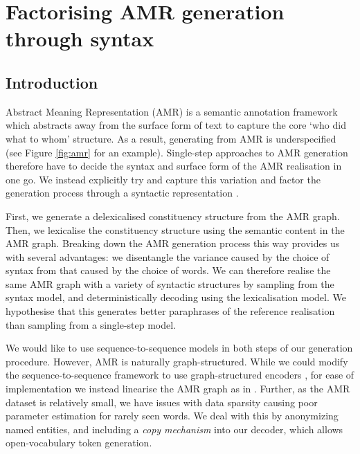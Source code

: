 \chapter{Factorising AMR generation through syntax}

\label{chap:amrgeneration}

\section{Introduction}

Abstract Meaning Representation (AMR) \citep{Baranescu:13} is a semantic annotation framework which abstracts away from the surface form of text to capture the core `who did what to whom' structure. As a result, generating from AMR is underspecified (see Figure \ref{fig:amr} for an example). Single-step approaches to AMR generation \citep{Flanigan:16,Konstas:17,Song:16,Song:17} therefore have to decide the syntax and surface form of the AMR realisation in one go. We instead explicitly try and capture this variation and factor the generation process through a syntactic representation \citep{Walker:03,Dusek:16,Gardent:17}. 

First, we generate a delexicalised constituency structure from the AMR graph. Then, we lexicalise the constituency structure using the semantic content in the AMR graph. Breaking down the AMR generation process this way provides us with several advantages: we disentangle the variance caused by the choice of syntax from that caused by the choice of words. We can therefore realise the same AMR graph with a variety of syntactic structures by sampling from the syntax model, and deterministically decoding using the lexicalisation model. We hypothesise that this generates better paraphrases of the reference realisation than sampling from a single-step model.

We would like to use sequence-to-sequence models \citep{Sutskever:14,Bahdanau:15} in both steps of our generation procedure. However, AMR is naturally graph-structured. While we could modify the sequence-to-sequence framework to use graph-structured encoders \citep{Kipf:16,Song:18,Beck:18,Marcheggiani:18}, for ease of implementation we instead linearise the AMR graph as in \citet{Konstas:17}. Further, as the AMR dataset is relatively small, we have issues with data sparsity causing poor parameter estimation for rarely seen words. We deal with this by anonymizing named entities, and including a \textit{copy mechanism} \citep{Vinyals:15b,See:17,Song:18} into our decoder, which allows open-vocabulary token generation.

